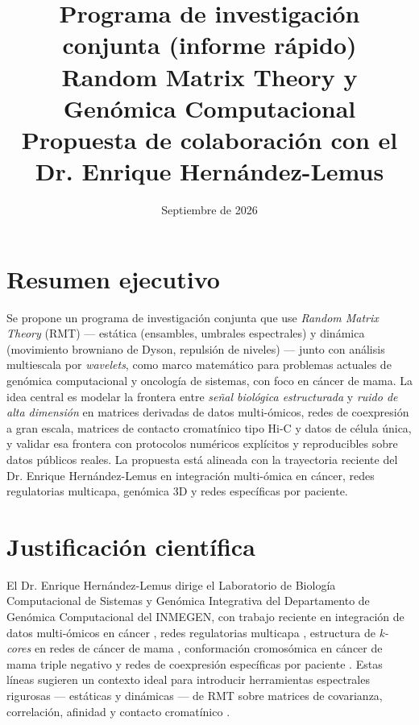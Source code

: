 \documentclass[11pt]{article}
\title{\vspace{-1cm}
Programa de investigación conjunta (informe rápido)\\[0.3em]
\large Random Matrix Theory y Genómica Computacional\\
\normalsize Propuesta de colaboración con el Dr. Enrique Hernández-Lemus}
\author{}
\date{Septiembre de 2026}
\begin{document}
\maketitle
\thispagestyle{empty}

\section*{Resumen ejecutivo}
Se propone un programa de investigación conjunta que use \emph{Random Matrix Theory} (RMT) --- estática (ensambles, umbrales espectrales) y dinámica (movimiento browniano de Dyson, repulsión de niveles) --- junto con análisis multiescala por \emph{wavelets}, como marco matemático para problemas actuales de genómica computacional y oncología de sistemas, con foco en cáncer de mama. La idea central es modelar la frontera entre \emph{señal biológica estructurada} y \emph{ruido de alta dimensión} en matrices derivadas de datos multi-ómicos, redes de coexpresión a gran escala, matrices de contacto cromatínico tipo Hi-C y datos de célula única, y validar esa frontera con protocolos numéricos explícitos y reproducibles sobre datos públicos reales. La propuesta está alineada con la trayectoria reciente del Dr. Enrique Hernández-Lemus en integración multi-ómica en cáncer, redes regulatorias multicapa, genómica 3D y redes específicas por paciente.

\section{Justificación científica}
El Dr. Enrique Hernández-Lemus dirige el Laboratorio de Biología Computacional de Sistemas y Genómica Integrativa del Departamento de Genómica Computacional del INMEGEN, con trabajo reciente en integración de datos multi-ómicos en cáncer \cite{multiomic2022}, redes regulatorias multicapa \cite{multilayer2021}, estructura de \emph{k-cores} en redes de cáncer de mama \cite{kcore2021}, conformación cromosómica en cáncer de mama triple negativo \cite{tnbc2025} y redes de coexpresión específicas por paciente \cite{luad2025}. Estas líneas sugieren un contexto ideal para introducir herramientas espectrales rigurosas --- estáticas y dinámicas --- de RMT sobre matrices de covarianza, correlación, afinidad y contacto cromatínico \cite{inmegen, multiomic2024, tnbc2025, luad2025}.
\end{document}
